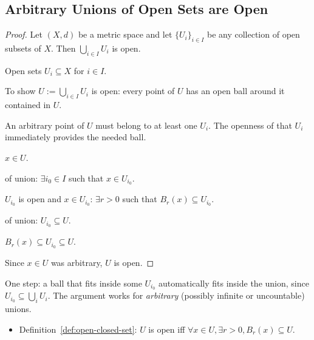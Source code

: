 
\subsection*{Arbitrary Unions of Open Sets are Open}
\label{prf:union-open}

\begin{proof}
\Claim Let $(X,d)$ be a metric space and let $\{U_i\}_{i \in I}$
be any collection of open subsets of $X$.
Then $\bigcup_{i \in I} U_i$ is open.

\Given Open sets $U_i \subseteq X$ for $i \in I$.

\Goal To show $U := \bigcup_{i \in I} U_i$ is open: every point of $U$
has an open ball around it contained in $U$.

\Strategy An arbitrary point of $U$ must belong to at least one $U_i$.
The openness of that $U_i$ immediately provides the needed ball.

\medskip
\Let $x \in U$.

\ByDef of union: $\exists i_0 \in I$ such that $x \in U_{i_0}$.

\ByAss $U_{i_0}$ is open and $x \in U_{i_0}$: $\exists r > 0$ such that $B_r(x) \subseteq U_{i_0}$.

\ByDef of union: $U_{i_0} \subseteq U$.

\Therefore $B_r(x) \subseteq U_{i_0} \subseteq U$.

Since $x \in U$ was arbitrary, $U$ is open. \AsReq
\end{proof}

\begin{remark*}
One step: a ball that fits inside some $U_{i_0}$ automatically fits inside
the union, since $U_{i_0} \subseteq \bigcup_i U_i$.
The argument works for \emph{arbitrary} (possibly infinite or uncountable) unions.
\end{remark*}

\begin{remark*}[Dependencies]
\begin{itemize}
  \item Definition~\ref{def:open-closed-set}: $U$ is open iff $\forall x \in U, \exists r > 0, B_r(x) \subseteq U$.
\end{itemize}
\end{remark*}
